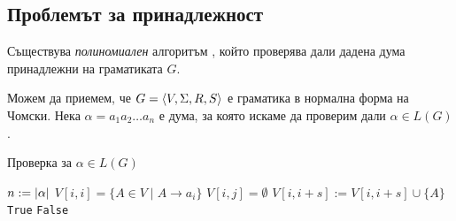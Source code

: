 \subsection{Проблемът за принадлежност}

\begin{thm}
  Съществува {\em полиномиален} алгоритъм , който проверява дали дадена дума принадлежни на граматиката $G$.
\end{thm}
Можем да приемем, че $G = \langle{V,\Sigma,R,S}\rangle$ е граматика в нормална форма на Чомски.
Нека $\alpha = a_1a_2\dots a_n$ е дума, за която искаме да проверим дали $\alpha \in L(G)$.
\begin{algorithm}[H]
  \caption{Проверка за $\alpha \in L(G)$}
  \label{alg:belongs-to-grammar}
  \begin{algorithmic}[1]
    \State $n := \lvert{\alpha}\rvert$ 
    \State $V[i,i] = \{A \in V \mid A\rightarrow a_i\}$
    \EndFor
    \State $V[i,j] = \emptyset$
    \EndFor      
    \ForAll{$s \in [1, n)$} 
    \ForAll{$k \in [i, i + s)$}
    \State $V[i,i+s] := V[i,i+s] \cup \{A\}$
    \EndIf
    \EndFor
    \EndFor
    \EndFor
    \State \Return \texttt{True}
    \Else
    \State \Return \texttt{False}
    \EndIf
  \end{algorithmic}
\end{algorithm}

